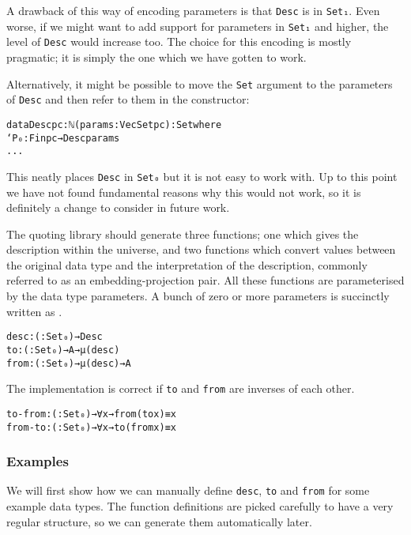 A drawback of this way of encoding parameters is that \texttt{Desc}
is in \texttt{Set₁}.
Even worse, if we might want to add support for parameters in
\texttt{Set₁} and higher, the level of \texttt{Desc} would increase
too.
The choice for this encoding is mostly pragmatic; it is simply the one
which we have gotten to work.

Alternatively, it might be possible to move the \texttt{Set} argument
to the parameters of \texttt{Desc} and then refer to them in the
constructor:

\begin{alltt}
data Desc {pc : ℕ}(params : Vec Set pc) : Set where
  `P₀ : Fin pc → Desc params
  ...
\end{alltt}

This neatly places \texttt{Desc} in \texttt{Set₀} but it is not
easy to work with.
Up to this point we have not found fundamental reasons why this would
not work, so it is definitely a change to consider in future work.

The quoting library should generate three functions; one which gives
the description within the universe, and two functions which convert
values between the original data type and the interpretation of the
description, commonly referred to as an embedding-projection pair.
All these functions are parameterised by the data type parameters.
A bunch of zero or more parameters is succinctly written as
\texttt{}.

\begin{alltt}
desc : ( : Set₀) → Desc
to : ( : Set₀) → A → μ (desc )
from : ( : Set₀) → μ (desc ) → A
\end{alltt}

The implementation is correct if \texttt{to} and \texttt{from} are
inverses of each other.

\begin{alltt}
to-from : ( : Set₀) → ∀ x → from  (to  x) ≡ x
from-to : ( : Set₀) → ∀ x → to  (from  x) ≡ x
\end{alltt}

\subsubsection{Examples}

We will first show how we can manually define \texttt{desc},
\texttt{to} and \texttt{from} for some example data types.
The function definitions are picked carefully to have a very
regular structure, so we can generate them automatically later.

